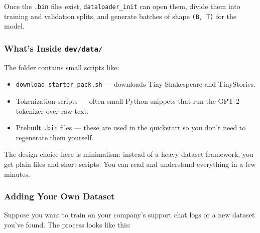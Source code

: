 \documentclass[
  letterpaper,
  DIV=11,
  numbers=noendperiod]{scrreprt}
\providecommand{\tightlist}{%
  \setlength{\itemsep}{0pt}\setlength{\parskip}{0pt}}
\begin{document}
Once the \texttt{.bin} files exist, \texttt{dataloader\_init} can open
them, divide them into training and validation splits, and generate
batches of shape \texttt{(B,\ T)} for the model.

\subsubsection{\texorpdfstring{What's Inside
\texttt{dev/data/}}{What's Inside dev/data/}}\label{whats-inside-devdata-1}

The folder contains small scripts like:

\begin{itemize}
\tightlist
\item
  \texttt{download\_starter\_pack.sh} --- downloads Tiny Shakespeare and
  TinyStories.
\item
  Tokenization scripts --- often small Python snippets that run the
  GPT-2 tokenizer over raw text.
\item
  Prebuilt \texttt{.bin} files --- these are used in the quickstart so
  you don't need to regenerate them yourself.
\end{itemize}

The design choice here is minimalism: instead of a heavy dataset
framework, you get plain files and short scripts. You can read and
understand everything in a few minutes.

\subsubsection{Adding Your Own Dataset}\label{adding-your-own-dataset}

Suppose you want to train on your company's support chat logs or a new
dataset you've found. The process looks like this:
\end{document}
